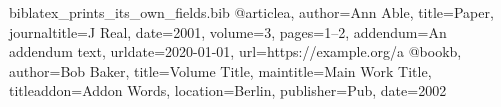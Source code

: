 \begin{filecontents*}[overwrite]{biblatex_prints_its_own_fields.bib}
@article{a, author={Ann Able}, title={Paper}, journaltitle={J Real}, date=2001, volume=3, pages={1--2},
  addendum={An addendum text}, urldate={2020-01-01}, url={https://example.org/a}}
@book{b, author={Bob Baker}, title={Volume Title}, maintitle={Main Work Title}, titleaddon={Addon Words},
  location={Berlin}, publisher={Pub}, date=2002}
\end{filecontents*}
\documentclass{article}
\usepackage{biblatex}


X \cite{a,b}.
\printbibliography

